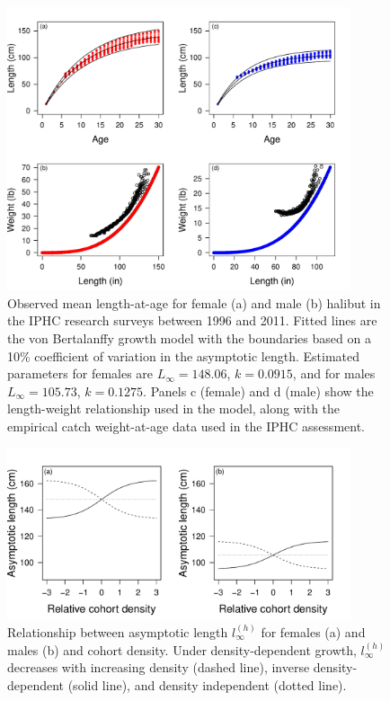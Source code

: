 \begin{figure}[htbp]
	\centering
		\includegraphics[width=0.9\textwidth]{../FIGURES/figLengthAtAgeFit.pdf}
	\caption{Observed mean length-at-age for female (a) and male (b) halibut in the IPHC research surveys between 1996 and 2011. Fitted lines are the von Bertalanffy growth model with the boundaries based on a 10\% coefficient of variation in the asymptotic length. Estimated parameters for females are $L_\infty=148.06$, $k=0.0915$, and for males $L_\infty=105.73$, $k=0.1275$. Panels c  (female) and d (male) show the length-weight relationship used in the model, along with the empirical catch weight-at-age data used in the IPHC assessment.}
	\label{fig:FIGURES_figLengthAtAgeFit}
\end{figure}

\begin{figure}[htbp]
	\centering
		\includegraphics[width=0.9\textwidth]{../FIGURES/figLinf.pdf}
	\caption{Relationship between asymptotic length $l_\infty^{(h)}$ for females (a) and males (b) and cohort density. Under density-dependent growth, $l_\infty^{(h)}$ decreases with increasing density (dashed line), inverse density-dependent (solid line), and density independent (dotted line).  }
	\label{fig:FIGURES_figLinf}
\end{figure}

